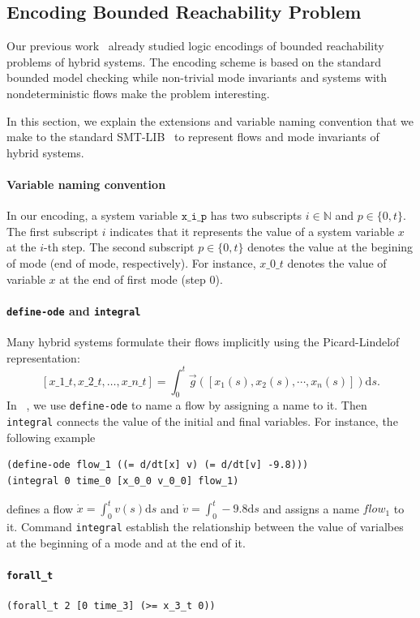 \subsection{Encoding Bounded Reachability Problem}

Our previous work~\cite{DBLP:journals/corr/GaoKCC14} already studied
logic encodings of bounded reachability problems of hybrid
systems. The encoding scheme is based on the standard bounded model
checking while non-trivial mode invariants and systems with
nondeterministic flows make the problem interesting.

In this section, we explain the extensions and variable naming
convention that we make to the standard SMT-LIB~\cite{BarST-SMT-10} to
represent flows and mode invariants of hybrid systems.

\paragraph{Variable naming convention}
In our encoding, a system variable $\texttt{x\_i\_p}$ has two
subscripts $i \in \mathbb{N}$ and $p \in \{0, t\}$. The first
subscript $i$ indicates that it represents the value of a system
variable $x$ at the $i$-th step. The second subscript $p \in \{0, t\}$
denotes the value at the begining of mode (end of mode,
respectively). For instance, $x\_0\_t$ denotes the value of variable
$x$ at the end of first mode (step 0).

\paragraph{\texttt{define-ode} and \texttt{integral}}
Many hybrid systems formulate their flows implicitly using
the Picard-Lindel$\ddot{o}$f representation:
\[
[x\_1\_t, x\_2\_t, \dots, x\_n\_t] = \int_0^t \vec{g}([x_1(s), x_2(s), \cdots,
x_n(s)]) \mathrm{d}s.
\]
In \dReach~{}, we use \texttt{define-ode} to name a flow by assigning
a name to it. Then \texttt{integral} connects the value of the initial
and final variables. For instance, the following example

\begin{Verbatim}[fontfamily=courier]
(define-ode flow_1 ((= d/dt[x] v) (= d/dt[v] -9.8)))
(integral 0 time_0 [x_0_0 v_0_0] flow_1)
\end{Verbatim}

defines a flow $\dot{x} = \int_0^t v(s) \mathrm{d}s$ and $\dot{v} =
\int_0^t -9.8 \mathrm{d}s$ and assigns a name $\mathit{flow_1}$ to it.
Command \texttt{integral} establish the relationship between the value
of varialbes at the beginning of a mode and at the end of it.

\paragraph{\texttt{forall\_t}}
\begin{Verbatim}[fontfamily=courier]
(forall_t 2 [0 time_3] (>= x_3_t 0))
\end{Verbatim}

